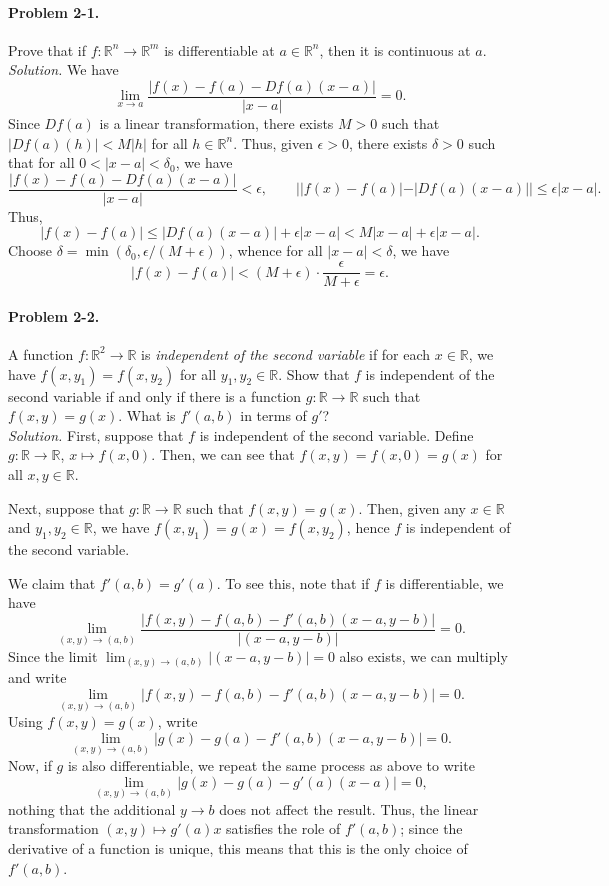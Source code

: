 \documentclass[11pt]{report}
\newcommand{\R}{\mathbb{R}}
\newcommand{\problem}[1]{\paragraph{Problem #1.}}
\newcommand{\solution}{\noindent\textit{Solution.} }
\begin{document}
    \problem{2-1} Prove that if $f\colon \R^n \to \R^m$ is differentiable at $a \in
    \R^n$, then it is continuous at $a$. \\

    \solution We have \[
        \lim_{x \to a} \frac{|f(x) - f(a) - Df(a)(x - a)|}{|x - a|} = 0.
    \] Since $Df(a)$ is a linear transformation, there exists $M > 0$ such that
    $|Df(a)(h)| < M|h|$ for all $h \in \R^n$. Thus, given $\epsilon > 0$, there
    exists $\delta > 0$ such that for all $0 < |x - a| < \delta_0$, we have \[
        \frac{|f(x) - f(a) - Df(a)(x - a)|}{|x - a|} < \epsilon, \qquad
        | |f(x) - f(a)| - |Df(a)(x - a)| | \leq \epsilon |x - a|.
    \] Thus, \[
        |f(x) - f(a)| \leq |Df(a)(x - a)| + \epsilon |x - a| < M|x - a| + \epsilon |x
        - a|.
    \] Choose $\delta = \min(\delta_0, \epsilon / (M + \epsilon))$, whence for all $|x -
    a| < \delta$, we have \[
        |f(x) - f(a)| < (M + \epsilon) \cdot \frac{\epsilon}{M + \epsilon} =
        \epsilon.
    \] 


    \problem{2-2} A function $f\colon \R^2 \to \R$ is \emph{independent of the second
    variable} if for each $x \in \R$, we have $f(x, y_1) = f(x, y_2)$ for all $y_1,
    y_2 \in \R$. Show that $f$ is independent of the second variable if and only if
    there is a function $g\colon \R \to \R$ such that $f(x, y) = g(x)$. What is
    $f'(a, b)$ in terms of $g'$? \\

    \solution First, suppose that $f$ is independent of the second variable. Define
    $g\colon \R \to \R$, $x \mapsto f(x, 0)$. Then, we can see that $f(x, y) = f(x,
    0) = g(x)$ for all $x, y \in \R$.

    Next, suppose that $g\colon \R \to \R$ such that $f(x, y) = g(x)$. Then, given
    any $x \in \R$ and $y_1, y_2 \in \R$, we have $f(x, y_1) = g(x) = f(x, y_2)$,
    hence $f$ is independent of the second variable.

    We claim that $f'(a, b) = g'(a)$. To see this, note that if $f$ is
    differentiable, we have \[
        \lim_{(x, y) \to (a, b)} \frac{|f(x, y) - f(a, b) - f'(a, b)(x - a, y -
        b)|}{|(x - a, y - b)|} = 0.
    \] Since the limit $\lim_{(x, y) \to (a, b)} |(x - a, y - b)| = 0$ also exists,
    we can multiply and write \[
        \lim_{(x, y) \to (a, b)} |f(x, y) - f(a, b) - f'(a, b)(x - a, y - b)| = 0.
    \] Using $f(x, y) = g(x)$, write \[
        \lim_{(x, y) \to (a, b)} |g(x) - g(a) - f'(a, b)(x - a, y - b)| = 0.
    \] Now, if $g$ is also differentiable, we repeat the same process as above to
    write \[
        \lim_{(x, y) \to (a, b)} |g(x) - g(a) - g'(a)(x - a)| = 0,
    \] nothing that the additional $y \to b$ does not affect the result. Thus, the
    linear transformation $(x, y) \mapsto g'(a)x$ satisfies the role of $f'(a, b)$;
    since the derivative of a function is unique, this means that this is the only
    choice of $f'(a, b)$.
\end{document}
